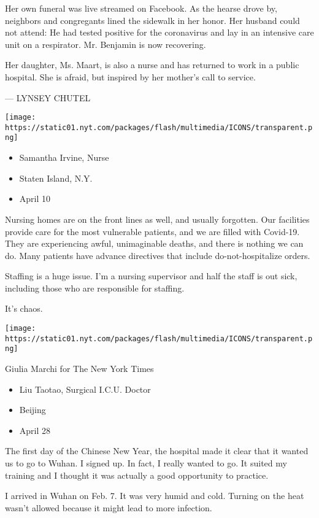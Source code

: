 Her own funeral was live streamed on Facebook. As the hearse drove by,
neighbors and congregants lined the sidewalk in her honor. Her husband
could not attend: He had tested positive for the coronavirus and lay in
an intensive care unit on a respirator. Mr. Benjamin is now recovering.

Her daughter, Ms. Maart, is also a nurse and has returned to work in a
public hospital. She is afraid, but inspired by her mother's call to
service.

--- LYNSEY CHUTEL

\texttt{[image: https://static01.nyt.com/packages/flash/multimedia/ICONS/transparent.png]}

\begin{itemize}
\tightlist
\item
  Samantha Irvine, Nurse
\item
  Staten Island, N.Y.
\item
  April 10
\end{itemize}

Nursing homes are on the front lines as well, and usually forgotten. Our
facilities provide care for the most vulnerable patients, and we are
filled with Covid-19. They are experiencing awful, unimaginable deaths,
and there is nothing we can do. Many patients have advance directives
that include do-not-hospitalize orders.

Staffing is a huge issue. I'm a nursing supervisor and half the staff is
out sick, including those who are responsible for staffing.

It's chaos.

\texttt{[image: https://static01.nyt.com/packages/flash/multimedia/ICONS/transparent.png]}

Giulia Marchi for The New York Times

\begin{itemize}
\tightlist
\item
  Liu Taotao, Surgical I.C.U. Doctor
\item
  Beijing
\item
  April 28
\end{itemize}

The first day of the Chinese New Year, the hospital made it clear that
it wanted us to go to Wuhan. I signed up. In fact, I really wanted to
go. It suited my training and I thought it was actually a good
opportunity to practice.

I arrived in Wuhan on Feb. 7. It was very humid and cold. Turning on the
heat wasn't allowed because it might lead to more infection.

